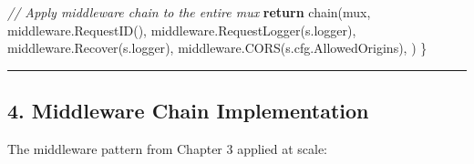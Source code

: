 \documentclass[
]{article}
\newenvironment{Shaded}{}{}
\newcommand{\CommentTok}[1]{\textcolor[rgb]{0.38,0.63,0.69}{\textit{#1}}}
\newcommand{\ControlFlowTok}[1]{\textcolor[rgb]{0.00,0.44,0.13}{\textbf{#1}}}
\newcommand{\NormalTok}[1]{#1}
\newcommand{\OperatorTok}[1]{\textcolor[rgb]{0.40,0.40,0.40}{#1}}
\begin{document}
\begin{Shaded}
\begin{Highlighting}[]
    \CommentTok{// Apply middleware chain to the entire mux}
    \ControlFlowTok{return}\NormalTok{ chain}\OperatorTok{(}\NormalTok{mux}\OperatorTok{,}
\NormalTok{        middleware}\OperatorTok{.}\NormalTok{RequestID}\OperatorTok{(),}
\NormalTok{        middleware}\OperatorTok{.}\NormalTok{RequestLogger}\OperatorTok{(}\NormalTok{s}\OperatorTok{.}\NormalTok{logger}\OperatorTok{),}
\NormalTok{        middleware}\OperatorTok{.}\NormalTok{Recover}\OperatorTok{(}\NormalTok{s}\OperatorTok{.}\NormalTok{logger}\OperatorTok{),}
\NormalTok{        middleware}\OperatorTok{.}\NormalTok{CORS}\OperatorTok{(}\NormalTok{s}\OperatorTok{.}\NormalTok{cfg}\OperatorTok{.}\NormalTok{AllowedOrigins}\OperatorTok{),}
    \OperatorTok{)}
\OperatorTok{\}}
\end{Highlighting}
\end{Shaded}

\begin{center}\rule{0.5\linewidth}{0.5pt}\end{center}

\hypertarget{middleware-chain-implementation}{%
\subsection{4. Middleware Chain
Implementation}\label{middleware-chain-implementation}}

The middleware pattern from Chapter 3 applied at scale:
\end{document}
